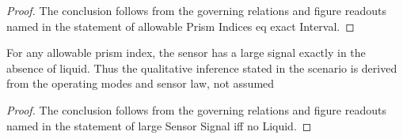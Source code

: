 \begin{proof}
  The conclusion follows from the governing relations and figure readouts named in the statement of allowable Prism Indices eq exact Interval.
\end{proof}
\begin{lemma}
  \label{lem:physics:phyx-mini-0147:phyxminiproblems-problemphyxmini0147-largesensorsignal-iff-noliquid}
  For any allowable prism index, the sensor has a large signal exactly in the absence of liquid. Thus the qualitative inference stated in the scenario is derived from the operating modes and sensor law, not assumed
\end{lemma}
\begin{proof}
  The conclusion follows from the governing relations and figure readouts named in the statement of large Sensor Signal iff no Liquid.
\end{proof}
